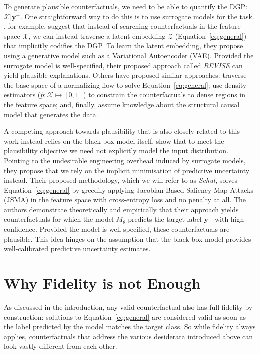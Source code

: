 \documentclass{article}
\begin{document}
To generate plausible counterfactuals, we need to be able to quantify the DGP: $\mathcal{X}|\mathbf{y}^+$. One straightforward way to do this is to use surrogate models for the task. \citet{joshi2019realistic}, for example, suggest that instead of searching counterfactuals in the feature space $\mathcal{X}$, we can instead traverse a latent embedding $\mathcal{Z}$ (Equation~\ref{eq:general}) that implicitly codifies the DGP. To learn the latent embedding, they propose using a generative model such as a Variational Autoencoder (VAE). Provided the surrogate model is well-specified, their proposed approach called \textit{REVISE} can yield plausible explanations. Others have proposed similar approaches: \citet{dombrowski2021diffeomorphic} traverse the base space of a normalizing flow to solve Equation~\ref{eq:general}; \citet{poyiadzi2020face} use density estimators ($\hat{p}: \mathcal{X} \mapsto [0,1]$) to constrain the counterfactuals to dense regions in the feature space; and, finally, \citet{karimi2021algorithmic} assume knowledge about the structural causal model that generates the data.

A competing approach towards plausibility that is also closely related to this work instead relies on the black-box model itself. \citet{schut2021generating} show that to meet the plausibility objective we need not explicitly model the input distribution. Pointing to the undesirable engineering overhead induced by surrogate models, they propose that we rely on the implicit minimisation of predictive uncertainty instead. Their proposed methodology, which we will refer to as \textit{Schut}, solves Equation~\ref{eq:general} by greedily applying Jacobian-Based Saliency Map Attacks (JSMA) in the feature space with cross-entropy loss and no penalty at all. The authors demonstrate theoretically and empirically that their approach yields counterfactuals for which the model $M_{\theta}$ predicts the target label $\mathbf{y}^+$ with high confidence. Provided the model is well-specified, these counterfactuals are plausible. This idea hinges on the assumption that the black-box model provides well-calibrated predictive uncertainty estimates.

\section{Why Fidelity is not Enough}\label{fidelity}

As discussed in the introduction, any valid counterfactual also has full fidelity by construction: solutions to Equation~\ref{eq:general} are considered valid as soon as the label predicted by the model matches the target class. So while fidelity always applies, counterfactuals that address the various desiderata introduced above can look vastly different from each other. 
\end{document}
